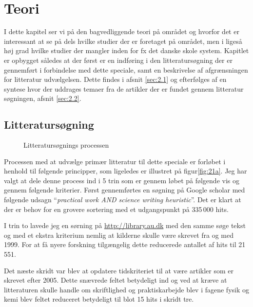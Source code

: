 \chapter{Teori}
\label{Ch:2}

I dette kapitel ser vi på den bagvedliggende teori på området og hvorfor det er interessant at se på dels hvilke studier der er foretaget på området, men i ligeså høj grad hvilke studier der mangler inden for fx det danske skole system. Kapitlet er opbygget således at der først er en indføring i den litteratursøgning der er gennemført i forbindelse med dette speciale, samt en beskrivelse af afgrænsningen for litteratur udvælgelsen. Dette findes i afsnit \vref{sec:2.1} og efterfølges af en syntese hvor der uddrages temaer fra de artikler der er fundet gennem litteratur søgningen, afsnit \vref{sec:2.2}.

\section{Litteratursøgning}
\label{sec:2.1}


\begin{wrapfigure}{o}{0.5\textwidth}
	\centering
	\caption{Litteratursøgnings processen}
	\label{fig:21a}
\end{wrapfigure}

Processen med at udvælge primær litteratur til dette speciale er forløbet i henhold til følgende principper, som ligeledes er illustret på  figur\vref{fig:21a}. Jeg har valgt at dele denne process ind i 5 trin som er gennem løbet på følgende vis og gennem følgende kriterier. Først gennemførtes en søgning på Google scholar med følgende udsagn ``\emph{practical work AND science writing heuristic}''. Det er klart at der er behov for en grovere sortering med et udgangspunkt på 335\,000 hits. 

I trin to lavede jeg en sørning på \url{http://library.au.dk} med den samme søge tekst og med et ekstra kriterium nemlig at kilderne skulle være skrevet fra og med 1999. For at få nyere forskning tilgængelig dette reducerede antallet af hits til 21\,551. 

Det næste skridt var blev at opdatere tidskriteriet til at være artikler som er skrevet efter 2005. Dette snævrede feltet betydeligt ind og ved at kræve at litteraturen skulle handle om skriftlighed og praktiskarbejde blev i fagene fysik og kemi blev feltet reduceret betydeligt til blot 15 hits i skridt tre.

